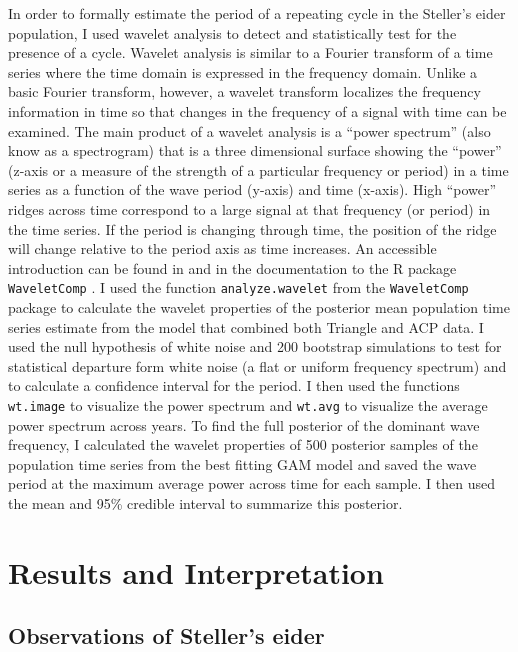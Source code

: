 \documentclass[
  10pt,
  letterpaper,
]{article}
\begin{document}
In order to formally estimate the period of a repeating cycle in the
Steller's eider population, I used wavelet analysis to detect and
statistically test for the presence of a cycle. Wavelet analysis is
similar to a Fourier transform of a time series where the time domain is
expressed in the frequency domain. Unlike a basic Fourier transform,
however, a wavelet transform localizes the frequency information in time
so that changes in the frequency of a signal with time can be examined.
The main product of a wavelet analysis is a ``power spectrum'' (also
know as a spectrogram) that is a three dimensional surface showing the
``power'' (z-axis or a measure of the strength of a particular frequency
or period) in a time series as a function of the wave period (y-axis)
and time (x-axis). High ``power'' ridges across time correspond to a
large signal at that frequency (or period) in the time series. If the
period is changing through time, the position of the ridge will change
relative to the period axis as time increases. An accessible
introduction can be found in \citep{cazelles2008wavelet} and in the
documentation to the R package \texttt{WaveletComp} \citep{r-wavelet}. I
used the function \texttt{analyze.wavelet} from the \texttt{WaveletComp}
package \citep{r-wavelet} to calculate the wavelet properties of the
posterior mean population time series estimate from the model that
combined both Triangle and ACP data. I used the null hypothesis of white
noise and 200 bootstrap simulations to test for statistical departure
form white noise (a flat or uniform frequency spectrum) and to calculate
a confidence interval for the period. I then used the functions
\texttt{wt.image} to visualize the power spectrum and \texttt{wt.avg} to
visualize the average power spectrum across years. To find the full
posterior of the dominant wave frequency, I calculated the wavelet
properties of 500 posterior samples of the population time series from
the best fitting GAM model and saved the wave period at the maximum
average power across time for each sample. I then used the mean and 95\%
credible interval to summarize this posterior.

\section{Results and Interpretation}\label{results-and-interpretation}

\subsection{Observations of Steller's
eider}\label{observations-of-stellers-eider}
\end{document}
